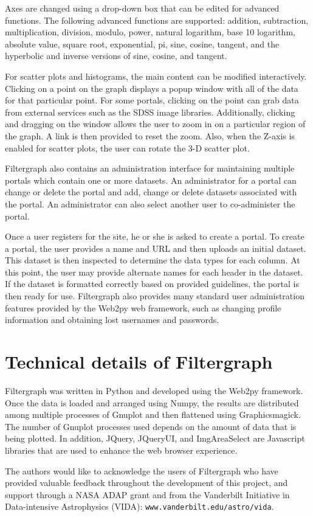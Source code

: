 Axes are changed using a drop-down box that can be edited for advanced functions. The
following advanced functions are supported: addition, subtraction, multiplication, division, modulo, power, natural logarithm, base 10 logarithm, absolute value, square root, exponential, pi, sine, cosine, tangent, and the hyperbolic and inverse versions of sine, cosine, and tangent.

For scatter plots and histograms, the main content can be modified
interactively. Clicking on a point on the graph displays a popup window with all
of the data for that particular point. For some portals, clicking on the
point can grab data from external services such as the SDSS image libraries. Additionally, clicking and dragging on the window allows the user to zoom in on a particular region of the graph. A link is then provided to reset the zoom. Also, when the Z-axis is enabled for scatter plots, the user can rotate
the 3-D scatter plot.

Filtergraph also contains an administration interface for maintaining multiple portals which contain one
or more datasets. An administrator for a portal can change or delete the
portal and add, change or delete datasets associated with the portal. An
administrator can also select another user to co-administer the portal.

Once a user registers for the site, he or she is asked to create a portal. To
create a portal, the user provides a name and URL and then uploads an
initial dataset. This dataset is then inspected to determine the data
types for each column. At this point, the user may provide alternate names
for each header in the dataset. If the dataset is formatted correctly based on provided guidelines,
the portal is then ready for use. Filtergraph also provides many standard user administration features provided by the Web2py web framework, such as changing profile information and obtaining
lost usernames and passwords.



\section{Technical details of Filtergraph}
Filtergraph was written in Python and developed using the Web2py framework. Once the data is loaded and arranged using Numpy, the results are distributed among multiple processes of Gnuplot and then flattened using Graphicsmagick. The number of Gnuplot processes used depends on the amount of data that is being plotted. In addition, JQuery, JQueryUI, and ImgAreaSelect are Javascript libraries that are used to enhance the web browser experience. 

\acknowledgements 
The authors would like to acknowledge the users of Filtergraph who have provided valuable feedback throughout the development of this project, and support 
through a NASA ADAP grant and from the Vanderbilt Initiative in Data-intensive
Astrophysics (VIDA): {\tt www.vanderbilt.edu/astro/vida}. 

